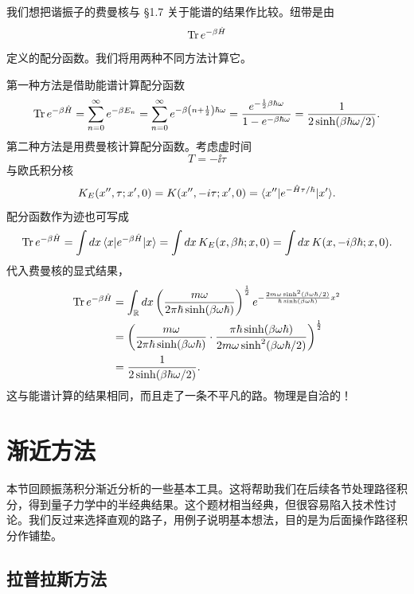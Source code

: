 我们想把谐振子的费曼核与 §1.7 关于能谱的结果作比较。纽带是由
\[
\operatorname{Tr}e^{-\beta\hat H}
\]
定义的配分函数。我们将用两种不同方法计算它。

第一种方法是借助能谱计算配分函数
\[
\operatorname{Tr}e^{-\beta\hat H}
=\sum_{n=0}^\infty e^{-\beta E_n}
=\sum_{n=0}^\infty e^{-\beta\left(n+\frac12\right)\hbar\omega}
=\frac{e^{-\frac12\beta\hbar\omega}}{1-e^{-\beta\hbar\omega}}
=\frac{1}{2\sinh(\beta\hbar\omega/2)}.
\]
第二种方法是用费曼核计算配分函数。考虑虚时间
\[
T=-\ii\tau
\]
与欧氏积分核
\[
K_E(x'',\tau;x',0)=K(x'',-i\tau;x',0)
=\langle x''|e^{-\hat H\tau/\hbar}|x'\rangle.
\]
配分函数作为迹也可写成
\[
\operatorname{Tr}e^{-\beta\hat H}
=\int d x\,\langle x|e^{-\beta\hat H}|x\rangle
=\int d x\,K_E(x,\beta\hbar;x,0)
=\int d x\,K(x,-i\beta\hbar;x,0).
\]
代入费曼核的显式结果，
\[
\begin{aligned}
\operatorname{Tr}e^{-\beta\hat H}
&=\int_{\mathbb{R}}d x\left(\frac{m\omega}{2\pi\hbar\sinh(\beta\omega\hbar)}\right)^{\frac12}
e^{-\frac{2m\omega\sinh^2(\beta\omega\hbar/2)}{\hbar\sinh(\beta\omega\hbar)}x^2}\\
&=\left(\frac{m\omega}{2\pi\hbar\sinh(\beta\omega\hbar)}
\cdot\frac{\pi\hbar\sinh(\beta\omega\hbar)}{2m\omega\sinh^2(\beta\omega\hbar/2)}\right)^{\frac12}\\
&=\frac{1}{2\sinh(\beta\hbar\omega/2)}.
\end{aligned}
\]
这与能谱计算的结果相同，而且走了一条不平凡的路。物理是自洽的！


\section{渐近方法}

本节回顾振荡积分渐近分析的一些基本工具。这将帮助我们在后续各节处理路径积分，得到量子力学中的半经典结果。这个题材相当经典，但很容易陷入技术性讨论。我们反过来选择直观的路子，用例子说明基本想法，目的是为后面操作路径积分作铺垫。

\subsection{拉普拉斯方法}


